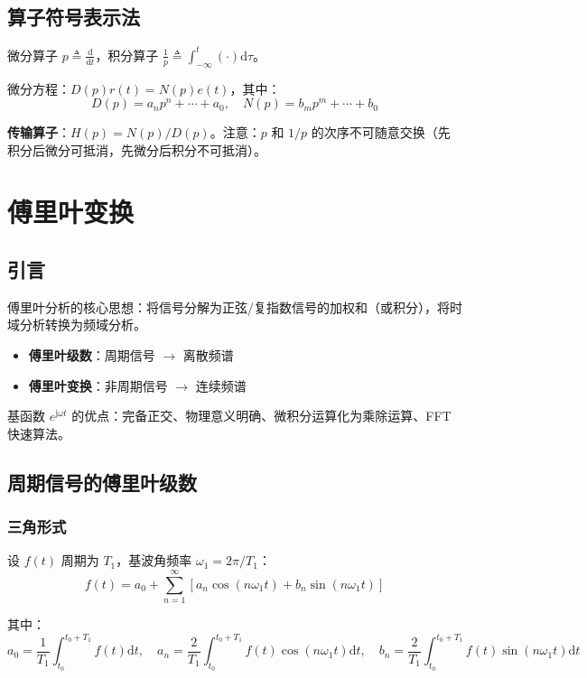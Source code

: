 \documentclass[11pt,a4paper]{ctexart}
\newcommand{\jj}{\mathrm{j}}            %
\newcommand{\dd}{\mathrm{d}}            %
\begin{document}
\subsection{算子符号表示法}

微分算子 $p \triangleq \frac{\dd}{\dd t}$，积分算子 $\frac{1}{p} \triangleq \int_{-\infty}^{t}(\cdot)\dd\tau$。

微分方程：$D(p)r(t) = N(p)e(t)$，其中：
\[
D(p) = a_n p^n + \cdots + a_0,\quad N(p) = b_m p^m + \cdots + b_0
\]

\textbf{传输算子}：$H(p) = N(p)/D(p)$。注意：$p$ 和 $1/p$ 的次序不可随意交换（先积分后微分可抵消，先微分后积分不可抵消）。

\newpage
\section{傅里叶变换}

\subsection{引言}

傅里叶分析的核心思想：将信号分解为正弦/复指数信号的加权和（或积分），将时域分析转换为频域分析。

\begin{itemize}
    \item \textbf{傅里叶级数}：周期信号 $\to$ 离散频谱
    \item \textbf{傅里叶变换}：非周期信号 $\to$ 连续频谱
\end{itemize}

基函数 $e^{\jj\omega t}$ 的优点：完备正交、物理意义明确、微积分运算化为乘除运算、FFT快速算法。

\subsection{周期信号的傅里叶级数}

\subsubsection{三角形式}
设 $f(t)$ 周期为 $T_1$，基波角频率 $\omega_1 = 2\pi/T_1$：
\[
f(t) = a_0 + \sum_{n=1}^{\infty}[a_n\cos(n\omega_1 t) + b_n\sin(n\omega_1 t)]
\]

其中：
\[
a_0 = \frac{1}{T_1}\int_{t_0}^{t_0+T_1} f(t)\dd t,\quad
a_n = \frac{2}{T_1}\int_{t_0}^{t_0+T_1} f(t)\cos(n\omega_1 t)\dd t,\quad
b_n = \frac{2}{T_1}\int_{t_0}^{t_0+T_1} f(t)\sin(n\omega_1 t)\dd t
\]
\end{document}
